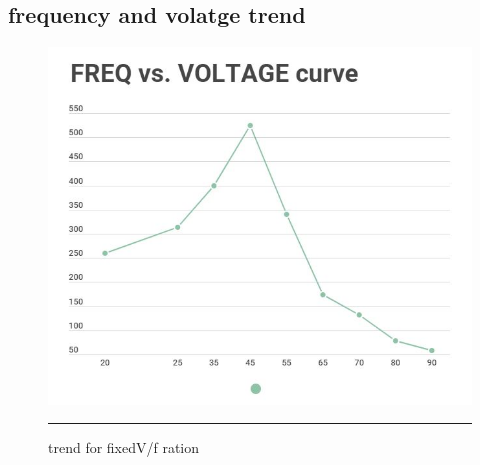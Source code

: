 \subsection{frequency and volatge trend}
\begin{figure}[htbp]
	\centering
	\includegraphics[width = 6in]{./Figures/Photos/task3/Graph1.JPG}
	\rule{35em}{1pt}
	\caption{trend for fixedV/f ration}
\end{figure}